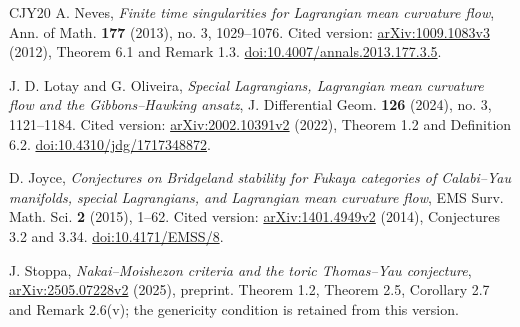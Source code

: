 \documentclass[12pt,reqno]{amsart}
\numberwithin{equation}{section}
\theoremstyle{plain}
\theoremstyle{definition}
\begin{document}
\begin{thebibliography}{CJY20}
 A. Neves,
\emph{Finite time singularities for Lagrangian mean curvature flow},
Ann. of Math. \textbf{177} (2013), no. 3, 1029--1076.
Cited version: \href{https://arxiv.org/abs/1009.1083v3}{arXiv:1009.1083v3}
(2012), Theorem 6.1 and Remark 1.3.
\href{https://doi.org/10.4007/annals.2013.177.3.5}{doi:10.4007/annals.2013.177.3.5}.

 J. D. Lotay and G. Oliveira,
\emph{Special Lagrangians, Lagrangian mean curvature flow and the
Gibbons--Hawking ansatz},
J. Differential Geom. \textbf{126} (2024), no. 3, 1121--1184.
Cited version: \href{https://arxiv.org/abs/2002.10391v2}{arXiv:2002.10391v2}
(2022), Theorem 1.2 and Definition 6.2.
\href{https://doi.org/10.4310/jdg/1717348872}{doi:10.4310/jdg/1717348872}.

 D. Joyce,
\emph{Conjectures on Bridgeland stability for Fukaya categories of
Calabi--Yau manifolds, special Lagrangians, and Lagrangian mean curvature flow},
EMS Surv. Math. Sci. \textbf{2} (2015), 1--62.
Cited version: \href{https://arxiv.org/abs/1401.4949v2}{arXiv:1401.4949v2}
(2014), Conjectures 3.2 and 3.34.
\href{https://doi.org/10.4171/EMSS/8}{doi:10.4171/EMSS/8}.

 J. Stoppa,
\emph{Nakai--Moishezon criteria and the toric Thomas--Yau conjecture},
\href{https://arxiv.org/abs/2505.07228v2}{arXiv:2505.07228v2} (2025),
preprint. Theorem 1.2, Theorem 2.5, Corollary 2.7 and
Remark 2.6(v); the genericity condition is retained from this version.

\end{thebibliography}
\end{document}
